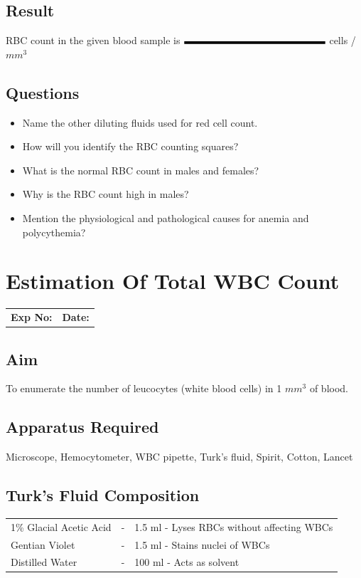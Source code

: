 \documentclass[a4paper,12pt]{book}
\begin{document}
\section*{Result}
RBC  count in the given  blood sample is $\rule{5cm}{0.1cm}$ cells / $mm^3$
\section*{Questions}
\begin{itemize}

\item {Name the other diluting fluids used for red  cell count.}
\item{How will you identify the RBC counting squares?}
\item{What is the normal RBC count in males and females?}
\item{Why is the RBC count high in males?}
\item{Mention the physiological and pathological causes for anemia and polycythemia?}


\end{itemize}

\chapter*{\centering Estimation Of Total WBC Count}

		\begin{tabular}{p{5in} p{1in}}
			\textbf{Exp No:}  & \textbf{Date:}\\
		\end{tabular}
	\section *{Aim}
	To enumerate the number of leucocytes (white blood cells) in 1 $mm^3$ of blood.
	\section*{Apparatus Required}
Microscope, Hemocytometer, WBC pipette, Turk’s fluid, Spirit, Cotton, Lancet
	\section*{Turk's Fluid Composition}
\begin{tabular}{l c l}
	
	1\% Glacial Acetic Acid	&	-&	1.5 ml - Lyses RBCs without affecting WBCs\\
	Gentian Violet&			-&	1.5 ml - Stains nuclei of WBCs\\
	Distilled Water&		-&	100 ml - Acts as solvent\\

\end{tabular}
\end{document}
